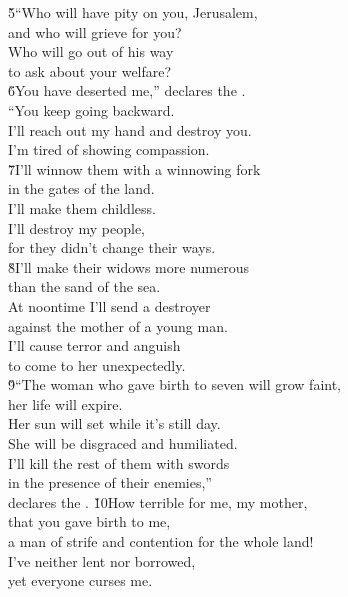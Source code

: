 \begin{poetry}
\poeml \v{5}``Who will have pity on you, Jerusalem, \\
\poemll    and who will grieve for you? \\
\poeml Who will go out of his way \\
\poemll    to ask about your welfare? \\
\poeml \v{6}You have deserted me,'' declares the . \\
\poemll    ``You keep going backward. \\
\poeml I'll reach out my hand and destroy you. \\
\poemll    I'm tired of showing compassion. \\
\poeml \v{7}I'll winnow them with a winnowing fork \\
\poemll    in the gates of the land. \\
\poeml I'll make them childless. \\
\poemll    I'll destroy my people, \\
\poemlll       for they didn't change their ways. \\
\poeml \v{8}I'll make their widows more numerous \\
\poemll    than the sand of the sea. \\
\poeml At noontime I'll send a destroyer \\
\poemll    against the mother of a young man. \\
\poeml I'll cause terror and anguish \\
\poemll    to come to her unexpectedly. \\
\poeml \v{9}``The woman who gave birth to seven will grow faint, \\
\poemll    her life will expire. \\
\poeml Her sun will set while it's still day. \\
\poemll    She will be disgraced and humiliated. \\
\poeml I'll kill the rest of them with swords \\
\poemll    in the presence of their enemies,'' \\
\poemlll       declares the .
\poeml \v{10}How terrible for me, my mother, \\
\poemll    that you gave birth to me, \\
\poeml a man of strife and contention for the whole land! \\
\poemll    I've neither lent nor borrowed, \\
\poemlll       yet everyone curses me.
\end{poetry}

